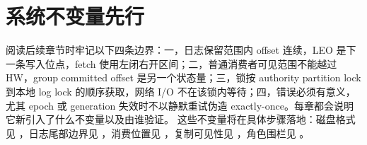 \section{系统不变量先行}
阅读后续章节时牢记以下四条边界：一，日志保留范围内 offset 连续，LEO 是下一条写入位点，fetch 使用左闭右开区间；二，普通消费者可见范围不能越过 HW，group committed offset 是另一个状态量；三，锁按 authority partition lock 到本地 log lock 的顺序获取，网络 I/O 不在该锁内等待；四，错误必须有意义，尤其 epoch 或 generation 失效时不以静默重试伪造 exactly-once。每章都会说明它新引入了什么不变量以及由谁验证。
这些不变量将在具体步骤落地：磁盘格式见 ，日志尾部边界见 ，消费位置见 ，复制可见性见 ，角色围栏见 。
